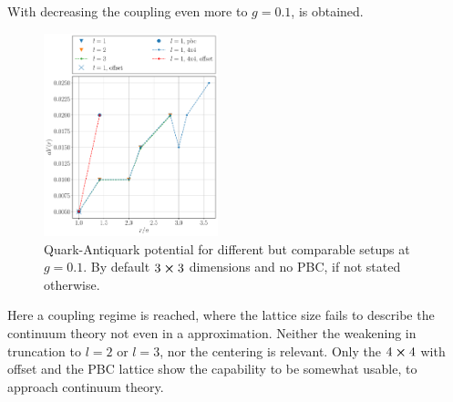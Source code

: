 With decreasing the coupling even more to $g=0.1$,  is obtained.
\begin{figure}[h]
	\begin{center}
		\includegraphics[width=0.45\textwidth]{images/quark_antiquark_potential_g_0.1.pdf}
	\end{center}
	\caption{Quark-Antiquark potential for different but comparable setups at $g=\num{0.1}$. By default $3\cross3$ dimensions and no PBC, if not stated otherwise.}\label{fig:qqbars1}
\end{figure}
Here a coupling regime is reached, where the lattice size fails to describe the continuum theory not even in a approximation. Neither the weakening in truncation to $l=2$ or $l=3$, nor the centering is relevant. Only the $4\cross4$ with offset and the PBC lattice show the capability to be somewhat usable, to approach continuum theory.

